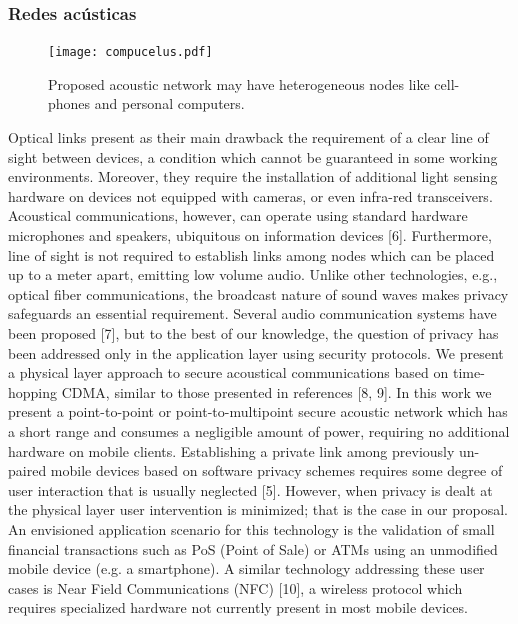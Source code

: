 \documentclass[12pt,twoside,openright]{moddalthesis}
\begin{document}
\subsubsection{Redes acústicas}
\begin{figure}[!t]
  \centering
    \texttt{[image: compucelus.pdf]}
    \caption{Proposed acoustic network may have heterogeneous nodes like cell-phones and personal computers.}
    \label{arch:chain}
\end{figure}


Optical links present as their main drawback the requirement of a clear line of sight between devices, a condition which cannot be guaranteed in some working environments. Moreover, they require the installation of additional light sensing hardware on devices not equipped with cameras, or even infra-red transceivers.
Acoustical communications, however, can operate using standard hardware microphones and speakers, ubiquitous on information devices [6]. Furthermore, line of sight is not required to establish links among nodes which can be placed up to a meter apart, emitting low volume audio.
Unlike other technologies, e.g., optical fiber communications, the broadcast nature of sound waves makes privacy safeguards an essential requirement. Several audio communication systems have been proposed [7], but to the best of our knowledge, the question of privacy has been addressed only in the application layer using security protocols. We present a physical layer approach to secure acoustical communications based on time-hopping CDMA, similar to those presented in references [8, 9]. In this work we present a point-to-point or point-to-multipoint secure acoustic network which has a short range and consumes a negligible amount of power, requiring no additional hardware on mobile clients.
Establishing a private link among previously un-paired mobile devices based on software privacy schemes requires some degree of user interaction that is usually neglected [5]. However, when privacy is dealt at the physical layer user intervention is minimized; that is the case in our proposal.
An envisioned application scenario for this technology is the validation of small financial transactions such as PoS (Point of Sale) or ATMs using an unmodified mobile device (e.g. a smartphone). A similar technology addressing these user cases is Near Field Communications (NFC) [10], a wireless protocol which requires specialized hardware not currently present in most mobile devices.
\end{document}
